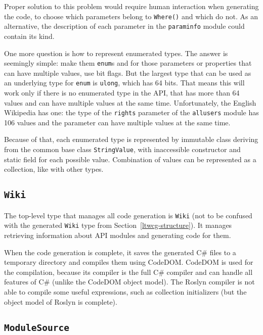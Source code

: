 Proper solution to this problem would require human interaction when generating the code,
to choose which parameters belong to \lstinline{Where()} and which do not.
As an alternative, the description of each parameter in the \texttt{paraminfo} module could contain its kind.

\medskip

One more question is how to represent enumerated types.
The answer is seemingly simple: make them \lstinline{enum}s
and for those parameters or properties that can have multiple values, use bit flags.
But the largest type that can be used as an underlying type for \lstinline{enum}
is \lstinline{ulong}, which has 64 bits.
That means this will work only if there is no enumerated type in the \ac{API},
that has more than 64 values and can have multiple values at the same time.
Unfortunately, the English Wikipedia has one:
the type of the \lstinline{rights} parameter of the \lstinline{allusers} module
has 106 values and the parameter can have multiple values at the same time.

Because of that, each enumerated type is represented by immutable class deriving from the common base class \lstinline{StringValue},
with inaccessible constructor and static field for each possible value.
Combination of values can be represented as a collection, like with other types.

\subsection{\texorpdfstring{\lstinline{Wiki}}{Wiki}}

The top-level type that manages all code generation is \lstinline{Wiki}
(not to be confused with the generated \lstinline{Wiki} type from Section~\ref{ltwcg-structure}).
It manages retrieving information about \ac{API} modules and generating code for them.

When the code generation is complete, it saves the generated C\# files to a temporary directory
and compiles them using CodeDOM.
CodeDOM is used for the compilation,
because its compiler is the full C\# compiler and can handle all features of C\# (unlike the CodeDOM object model).
The Roslyn compiler is not able to compile some useful expressions, such as collection initializers
(but the object model of Roslyn is complete).

\subsection{\texorpdfstring{\lstinline{ModuleSource}}{ModuleSource}}

